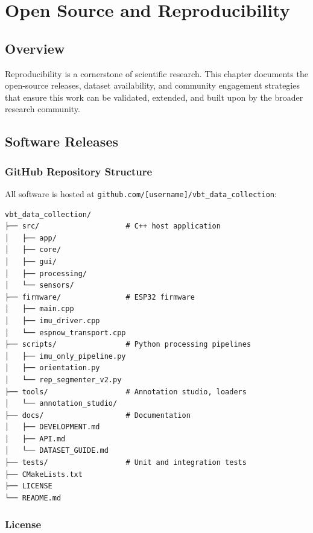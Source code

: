 
\chapter{Open Source and Reproducibility} \label{chap:opensource}

\section{Overview}

Reproducibility is a cornerstone of scientific research. This chapter documents the open-source releases, dataset availability, and community engagement strategies that ensure this work can be validated, extended, and built upon by the broader research community.

\section{Software Releases}

\subsection{GitHub Repository Structure}

All software is hosted at \texttt{github.com/[username]/vbt\_data\_collection}:

\begin{verbatim}
vbt_data_collection/
├── src/                    # C++ host application
│   ├── app/
│   ├── core/
│   ├── gui/
│   ├── processing/
│   └── sensors/
├── firmware/               # ESP32 firmware
│   ├── main.cpp
│   ├── imu_driver.cpp
│   └── espnow_transport.cpp
├── scripts/                # Python processing pipelines
│   ├── imu_only_pipeline.py
│   ├── orientation.py
│   └── rep_segmenter_v2.py
├── tools/                  # Annotation studio, loaders
│   └── annotation_studio/
├── docs/                   # Documentation
│   ├── DEVELOPMENT.md
│   ├── API.md
│   └── DATASET_GUIDE.md
├── tests/                  # Unit and integration tests
├── CMakeLists.txt
├── LICENSE
└── README.md
\end{verbatim}

\subsection{License}

